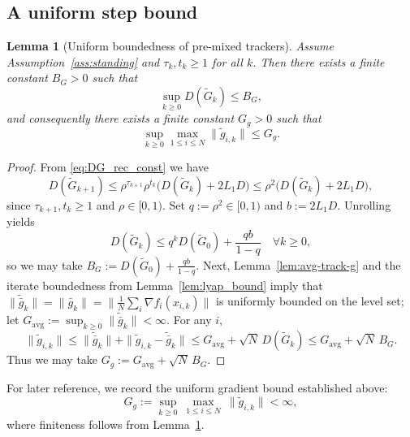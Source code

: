 \documentclass[11pt,a4paper]{article}
\newtheorem{lemma}[theorem]{Lemma}
\begin{document}
\subsection{A uniform step bound}

\begin{lemma}[Uniform boundedness of pre-mixed trackers]\label{lem:tilde_track_bounded}
Assume Assumption~\ref{ass:standing} and $\tau_k,t_k\ge 1$ for all $k$.
Then there exists a finite constant $B_G>0$ such that
\[
\sup_{k\ge 0} D(\tilde G_k)\le B_G,
\]
and consequently there exists a finite constant $G_g>0$ such that
\[
\sup_{k\ge 0}\max_{1\le i\le N}\|\tilde g_{i,k}\|\le G_g.
\]
\end{lemma}
\begin{proof}
From \eqref{eq:DG_rec_const} we have
\[
D(\tilde G_{k+1})\le \rho^{\tau_{k+1}}\rho^{t_k}\big(D(\tilde G_k)+2L_1D\big)\le \rho^2\big(D(\tilde G_k)+2L_1D\big),
\]
since $\tau_{k+1},t_k\ge 1$ and $\rho\in[0,1)$.
Set $q:=\rho^2\in[0,1)$ and $b:=2L_1D$. Unrolling yields
\[
D(\tilde G_k)\le q^k D(\tilde G_0)+\frac{qb}{1-q}\quad\forall k\ge 0,
\]
so we may take $B_G:=D(\tilde G_0)+\frac{qb}{1-q}$.
Next, Lemma~\ref{lem:avg-track-g} and the iterate boundedness from Lemma~\ref{lem:lyap_bound} imply that
$\|\tilde{\bar g}_k\|=\|\bar g_k\|=\big\|\frac1N\sum_i \nabla f_i(x_{i,k})\big\|$ is uniformly bounded on the level set;
let $G_{\mathrm{avg}}:=\sup_{k\ge 0}\|\tilde{\bar g}_k\|<\infty$.
For any $i$,
\[
\|\tilde g_{i,k}\|\le \|\tilde{\bar g}_k\|+\|\tilde g_{i,k}-\tilde{\bar g}_k\|
\le G_{\mathrm{avg}}+\sqrt N\,D(\tilde G_k)\le G_{\mathrm{avg}}+\sqrt N\,B_G.
\]
Thus we may take $G_g:=G_{\mathrm{avg}}+\sqrt N\,B_G$.
\end{proof}

For later reference, we record the uniform gradient bound established above:
\begin{equation}\label{eq:step_unif_app}
G_g:=\sup_{k\ge 0}\ \max_{1\le i\le N}\ \|\tilde g_{i,k}\| < \infty,
\end{equation}
where finiteness follows from Lemma~\ref{lem:tilde_track_bounded}.
\end{document}
